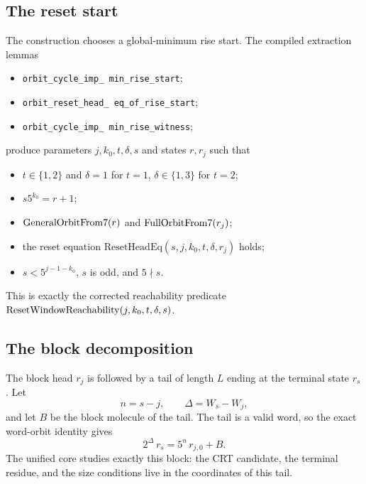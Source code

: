 \subsection{The reset start}

The construction chooses a global-minimum rise start.  The compiled
extraction lemmas
\begin{itemize}[leftmargin=*]
\item \texttt{orbit\_\allowbreak cycle\_\allowbreak imp\_\allowbreak
  min\_\allowbreak rise\_\allowbreak start};
\item \texttt{orbit\_\allowbreak reset\_\allowbreak head\_\allowbreak
  eq\_\allowbreak of\_\allowbreak rise\_\allowbreak start};
\item \texttt{orbit\_\allowbreak cycle\_\allowbreak imp\_\allowbreak
  min\_\allowbreak rise\_\allowbreak witness};
\end{itemize}
produce parameters $j,k_0,t,\delta,s$ and states $r,r_j$ such that
\begin{itemize}[leftmargin=*]
\item $t\in\{1,2\}$ and $\delta=1$ for $t=1$,
  $\delta\in\{1,3\}$ for $t=2$;
\item $s5^{k_0}=r+1$;
\item $\mathrm{GeneralOrbitFrom7}(r)$ and $\mathrm{FullOrbitFrom7}(r_j)$;
\item the reset equation
  $\mathrm{ResetHeadEq}(s,j,k_0,t,\delta,r_j)$ holds;
\item $s<5^{j-1-k_0}$, $s$ is odd, and $5\nmid s$.
\end{itemize}
This is exactly the corrected reachability predicate
$\mathrm{ResetWindowReachability}(j,k_0,t,\delta,s)$.

\subsection{The block decomposition}

The block head $r_j$ is followed by a tail of length $L$ ending at the
terminal state $r_s$.  Let
\begin{equation*}
  n=s-j,\qquad \Delta=W_s-W_j,
\end{equation*}
and let $B$ be the block molecule of the tail.  The tail is a valid
word, so the exact word-orbit identity gives
\begin{equation*}
  2^{\Delta}\,r_s=5^n\,r_{j,0}+B.
\end{equation*}
The unified core studies exactly this block: the CRT candidate, the
terminal residue, and the size conditions live in the coordinates of
this tail.

